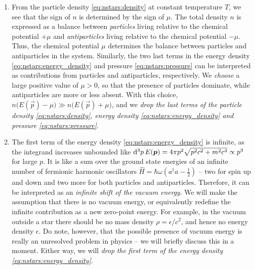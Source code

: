 \begin{enumerate}

\item
From the particle density \eqref{eq:nstars:density} at constant temperature $T$, we see that the sign of $n$ is determined by the sign of $\mu$.
The total density $n$ is expressed as a balance between \emph{particles} living relative to the chemical potential $+\mu$ and \emph{antiparticles} living relative to the chemical potential $-\mu$.
Thus, the chemical potential $\mu$ determines the balance between particles and antiparticles in the system.
Similarly, the two last terms in the energy density \eqref{eq:nstars:energy_density} and pressure \eqref{eq:nstars:pressure} can be interpreted as contributions from particles and antiparticles, respectively.
We \emph{choose} a large positive value of $\mu > 0$, so that the presence of particles dominate, while antiparticles are more or less absent.
With this choice, $n \big( E(\vec{p}) - \mu \big) \gg n \big( E(\vec{p}) + \mu \big)$, and we \emph{drop the last terms of the particle density \eqref{eq:nstars:density}, energy density \eqref{eq:nstars:energy_density} and pressure \eqref{eq:nstars:pressure}}.

\item
The first term of the energy density \eqref{eq:nstars:energy_density} is infinite, as the integrand increases unbounded like $\mathop{}\!\mathrm{d}^3 p \, E({\bm{p}}) = 4 \pi p^2 \sqrt{p^2 c^2 + m^2 c^4} \propto p^3$ for large $p$.
It is like a sum over the ground state energies of an infinite number of fermionic harmonic oscillators $\hat{H} = \hbar \omega \left( a^\dagger a - \frac{1}{2} \right)$ -- two for spin up and down and two more for both particles and antiparticles.
Therefore, it can be interpreted as an \emph{infinite shift of the vacuum energy}.
We will make the assumption that there is no vacuum energy, or equivalently redefine the infinite contribution as a new zero-point energy.
For example, in the vacuum outside a star there should be no mass density $\rho = \epsilon / c^2$, and hence no energy density $\epsilon$.
Do note, however, that the possible presence of vacuum energy is really an unresolved problem in physics -- we will briefly discuss this in a moment.
Either way, we will \emph{drop the first term of the energy density \eqref{eq:nstars:energy_density}}.


\end{enumerate}
